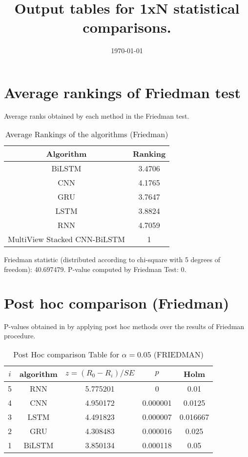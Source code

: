 \documentclass[a4paper,10pt]{article}
\title{Output tables for 1xN statistical comparisons.}
\author{}
\date{\today}
\begin{document}
\begin{landscape}
\pagestyle{empty}
\maketitle
\thispagestyle{empty}

\section{Average rankings of Friedman test}


Average ranks obtained by each method in the Friedman test.

\begin{table}[!htp]
\centering
\begin{tabular}{|c|c|}\hline
Algorithm&Ranking\\\hline
BiLSTM&3.4706\\CNN&4.1765\\GRU&3.7647\\LSTM&3.8824\\RNN&4.7059\\MultiView Stacked CNN-BiLSTM&1\\\hline\end{tabular}
\caption{Average Rankings of the algorithms (Friedman)}
\end{table}

Friedman statistic (distributed according to chi-square with 5 degrees of freedom): 40.697479. \newline P-value computed by Friedman Test: 0.\newline


\newpage

\section{Post hoc comparison (Friedman)}


P-values obtained in by applying post hoc methods over the results of Friedman procedure.

\begin{table}[!htp]
\centering\footnotesize
\begin{tabular}{ccccc}
$i$&algorithm&$z=(R_0 - R_i)/SE$&$p$&Holm \\
\hline5&RNN&5.775201&0&0.01\\4&CNN&4.950172&0.000001&0.0125\\3&LSTM&4.491823&0.000007&0.016667\\2&GRU&4.308483&0.000016&0.025\\1&BiLSTM&3.850134&0.000118&0.05\\\hline
\end{tabular}
\caption{Post Hoc comparison Table for $\alpha=0.05$ (FRIEDMAN)}
\end{table}
\newpage


\end{landscape}
\end{document}
